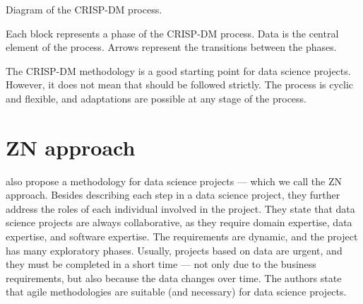 \begin{figurebox}[label=fig:cripdm]{Diagram of the CRISP-DM process.}
  \centering
  \tcblower
  Each block represents a phase of the CRISP-DM process.  Data is the central element of
  the process.  Arrows represent the transitions between the phases.
\end{figurebox}

The CRISP-DM methodology is a good starting point for data science projects.  However, it
does not mean that should be followed strictly.  The process is cyclic and flexible, and
adaptations are possible at any stage of the process.

\section{ZN approach}

\textcite{Zumel2019} also propose a methodology for data science projects --- which we
call the ZN approach.  Besides
describing each step in a data science project, they further address the roles of each
individual involved in the project.  They state that data science projects are always
collaborative, as they require domain expertise, data expertise, and software expertise.
The requirements are dynamic, and the project has many exploratory phases.  Usually,
projects based on data are urgent, and they must be completed in a short time --- not
only due to the business requirements, but also because the data changes over time.
The authors state that agile methodologies are suitable (and necessary) for data science
projects.

